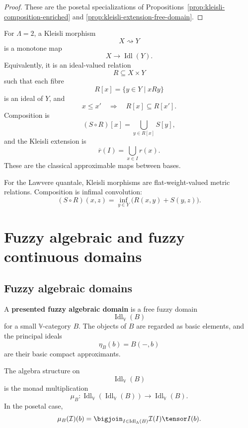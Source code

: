 \begin{proof}
These are the posetal specializations of
Propositions~\ref{prop:kleisli-composition-enriched} and
\ref{prop:kleisli-extension-free-domain}.
\end{proof}

\begin{example}
\label{ex:crisp-kleisli}
For \(\Lambda=2\), a Kleisli morphism
\[
    X\rightsquigarrow Y
\]
is a monotone map
\[
    X\to\operatorname{Idl}(Y).
\]
Equivalently, it is an ideal-valued relation
\[
    R\subseteq X\times Y
\]
such that each fibre
\[
    R[x]=\{y\in Y\mid xRy\}
\]
is an ideal of \(Y\), and
\[
    x\leq x'
    \quad\Longrightarrow\quad
    R[x]\subseteq R[x'].
\]
Composition is
\[
    (S\circ R)[x]
    =
    \bigcup_{y\in R[x]}S[y],
\]
and the Kleisli extension is
\[
    \overline r(I)=\bigcup_{x\in I}r(x).
\]
These are the classical approximable maps between bases.
\end{example}

\begin{example}
\label{ex:lawvere-kleisli}
For the Lawvere quantale, Kleisli morphisms are flat-weight-valued metric
relations.  Composition is infimal convolution:
\[
    (S\circ R)(x,z)
    =
    \inf_{y\in Y}\bigl(R(x,y)+S(y,z)\bigr).
\]
\end{example}

\section{Fuzzy algebraic and fuzzy continuous domains}
\label{sec:fuzzy-algebraic-continuous-domains}

\subsection{Fuzzy algebraic domains}
\label{subsec:fuzzy-algebraic-domains}

\begin{definition}
\label{def:presented-fuzzy-algebraic-domain}
A \textbf{presented fuzzy algebraic domain} is a free fuzzy domain
\[
    \operatorname{Idl}_{\mathbb V}(B)
\]
for a small \(\mathbb V\)-category \(B\).  The objects of \(B\) are regarded as
basic elements, and the principal ideals
\[
    \eta_B(b)=B(-,b)
\]
are their basic compact approximants.
\end{definition}

\begin{proposition}
\label{prop:free-fuzzy-domain-algebra-structure}
The algebra structure on
\[
    \operatorname{Idl}_{\mathbb V}(B)
\]
is the monad multiplication
\[
    \mu_B:
    \operatorname{Idl}_{\mathbb V}(\operatorname{Idl}_{\mathbb V}(B))
    \to
    \operatorname{Idl}_{\mathbb V}(B).
\]
In the posetal case,
\[
    \mu_B(\mathcal I)(b)
    =
    \bigjoin_{I\in\operatorname{Idl}_\Lambda(B)}
    \mathcal I(I)\tensor I(b).
\]
\end{proposition}

